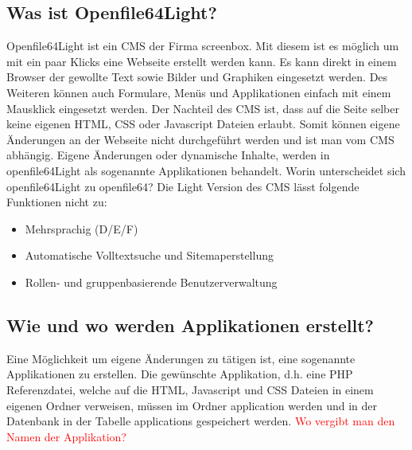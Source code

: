 \documentclass[a4paper,ngerman, 11pt, pagesize]{report}
\newcommand\Diskussionspunkt[1]{\textcolor{red}{#1}}
\begin{document}
  
\subsection{Was ist Openfile64Light?}
Openfile64Light ist ein CMS der Firma screenbox. Mit diesem ist es möglich um mit ein paar Klicks eine Webseite erstellt werden kann. Es kann direkt in einem Browser der gewollte Text sowie Bilder und Graphiken eingesetzt werden. Des Weiteren können auch Formulare, Menüs und Applikationen einfach mit einem Mausklick eingesetzt werden. Der Nachteil des CMS ist, dass auf die Seite selber keine eigenen HTML, CSS oder Javascript Dateien erlaubt. Somit können eigene Änderungen an der Webseite nicht durchgeführt werden und ist man vom CMS abhängig. Eigene Änderungen oder dynamische Inhalte, werden in openfile64Light als sogenannte Applikationen behandelt. Worin unterscheidet sich openfile64Light zu openfile64? Die Light Version des CMS lässt folgende Funktionen nicht zu:
\begin{itemize}
\item Mehrsprachig (D/E/F)
\item Automatische Volltextsuche und Sitemaperstellung
\item Rollen- und gruppenbasierende Benutzerverwaltung
\end{itemize}


\subsection{Wie und wo werden Applikationen erstellt?}
Eine Möglichkeit um eigene Änderungen zu tätigen ist, eine sogenannte Applikationen zu erstellen. Die gewünschte Applikation, d.h. eine PHP Referenzdatei, welche auf die HTML, Javascript und CSS Dateien in einem eigenen Ordner verweisen, müssen im Ordner application werden und in der Datenbank in der Tabelle applications gespeichert werden.
\Diskussionspunkt{Wo vergibt man den Namen der Applikation?}\\
\end{document}
